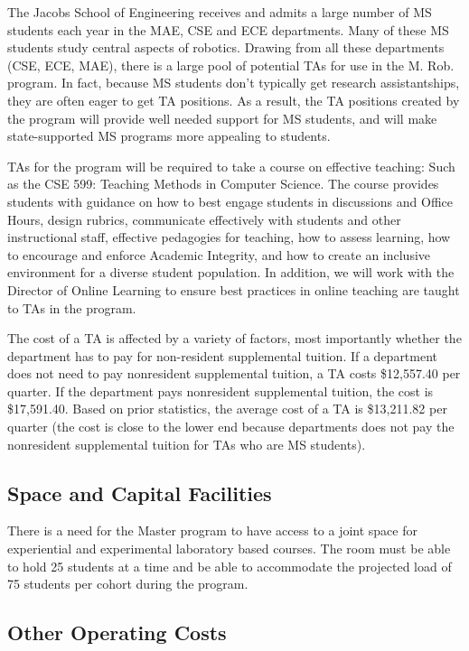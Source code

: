 \documentclass[11pt,letterpaper]{article}
\begin{document}
The Jacobs School of Engineering receives and admits a large number of
MS students each year in the MAE, CSE and ECE departments. Many of
these MS students study central aspects of robotics. Drawing from all
these departments (CSE, ECE, MAE), there is a large pool of potential
TAs for use in the M. Rob. program. In fact, because MS students don’t
typically get research assistantships, they are often eager to get TA
positions. As a result, the TA positions created by the program will
provide well needed support for MS students, and will make
state-supported MS programs more appealing to students.

TAs for the program will be required to take a course on effective
teaching: Such as the CSE 599: Teaching Methods in Computer Science.
The course provides students with guidance on how to best engage
students in discussions and Office Hours, design rubrics, communicate
effectively with students and other instructional staff, effective
pedagogies for teaching, how to assess learning, how to
encourage and enforce Academic Integrity, and how to create an
inclusive environment for a diverse student population. In addition,
we will work with the Director of Online Learning to ensure best
practices in online teaching are taught to TAs in the program.

The cost of a TA is affected by a variety of factors, most importantly
whether the department has to pay for non-resident supplemental
tuition. If a department does not need to pay nonresident
supplemental tuition, a TA costs \$12,557.40 per quarter. If the
department pays nonresident supplemental tuition, the cost is
\$17,591.40. Based on prior statistics, the average cost of a TA is
\$13,211.82 per quarter (the cost is close to the lower end because 
departments does not pay the nonresident supplemental tuition for TAs
who are MS students).

\subsection{Space and Capital Facilities}

There is a need for the Master program to have access to a joint space
for experiential and experimental laboratory based courses. The room
must be able to hold 25 students at a time and be able to accommodate
the projected  load of 75 students per cohort during the program.

\subsection{Other Operating Costs}
\end{document}
